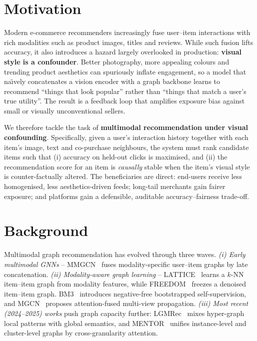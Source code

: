 \documentclass[12pt,a4paper]{article}
\begin{document}
\section{Motivation}
Modern e-commerce recommenders increasingly fuse user--item interactions with rich
modalities such as product images, titles and reviews. While such fusion lifts accuracy,
it also introduces a hazard largely overlooked in production: \textbf{visual style is a
confounder}. Better photography, more appealing colours and trending product aesthetics
can spuriously inflate engagement, so a model that na\"{\i}vely concatenates a vision
encoder with a graph backbone learns to recommend ``things that look popular'' rather
than ``things that match a user's true utility''. The result is a feedback loop that
amplifies exposure bias against small or visually unconventional sellers.

We therefore tackle the task of \textbf{multimodal recommendation under visual
confounding}. Specifically, given a user's interaction history together with each
item's image, text and co-purchase neighbours, the system must rank candidate items
such that (i) accuracy on held-out clicks is maximised, and (ii) the recommendation
score for an item is \emph{causally} stable when the item's visual style is
counter-factually altered. The beneficiaries are direct: end-users receive less
homogenised, less aesthetics-driven feeds; long-tail merchants gain fairer exposure;
and platforms gain a defensible, auditable accuracy--fairness trade-off.

\section{Background}
Multimodal graph recommendation has evolved through three waves. \emph{(i) Early multimodal
GNNs} -- MMGCN~\citep{wei2019mmgcn} fuses modality-specific user--item graphs by late
concatenation. \emph{(ii) Modality-aware graph learning} -- LATTICE~\citep{zhang2021lattice}
learns a $k$-NN item--item graph from modality features, while
FREEDOM~\citep{zhou2023freedom} freezes a denoised item--item graph. BM3~\citep{zhou2023bm3}
introduces negative-free bootstrapped self-supervision, and MGCN~\citep{yu2023mgcn}
proposes attention-fused multi-view propagation. \emph{(iii) Most recent (2024--2025) works}
push graph capacity further: LGMRec~\citep{guo2024lgmrec} mixes hyper-graph local
patterns with global semantics, and MENTOR~\citep{xu2025mentor} unifies instance-level
and cluster-level graphs by cross-granularity attention.
\end{document}
